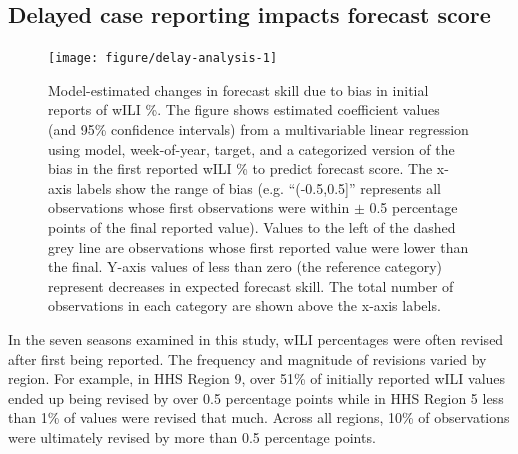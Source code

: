 \documentclass{article}\usepackage[]{graphicx}\usepackage[]{color}
\newenvironment{knitrout}{}{} %
\begin{document}

\subsection*{Delayed case reporting impacts forecast score}\label{sec:delays}
\begin{knitrout}
\color{fgcolor}\begin{figure}
\texttt{[image: figure/delay-analysis-1]} \caption[Model-estimated changes in forecast skill due to bias in initial reports of wILI \%]{Model-estimated changes in forecast skill due to bias in initial reports of wILI \%. The figure shows estimated coefficient values (and 95\% confidence intervals) from a multivariable linear regression using model, week-of-year, target, and a categorized version of the bias in the first reported wILI \% to predict forecast score.  The x-axis labels show the range of bias (e.g. ``(-0.5,0.5]'' represents all observations whose first observations were within $\pm$ 0.5 percentage points of the final reported value). Values to the left of the dashed grey line are observations whose first reported value were lower than the final. Y-axis values of less than zero (the reference category) represent decreases in expected forecast skill. The total number of observations in each category are shown above the x-axis labels.}\label{fig:delay-analysis}
\end{figure}


\end{knitrout}

In the seven seasons examined in this study, wILI percentages were often revised after first being reported. 
The frequency and magnitude of revisions varied by region.
For example, in HHS Region 9, over 51\% of initially reported wILI values ended up being revised by over 0.5 percentage points while in HHS Region 5 less than 1\% of values were revised that much. %
Across all regions, 10\% of observations were ultimately revised by more than 0.5 percentage points.
\end{document}
